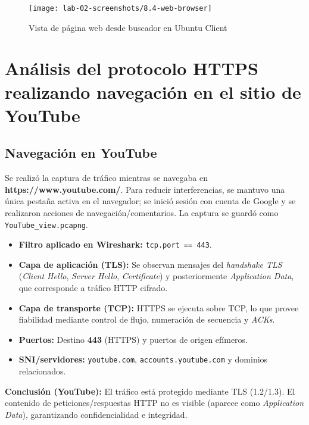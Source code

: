 \documentclass[10pt]{article}
\begin{document}
\begin{figure}[H]
    \centering
    \texttt{[image: lab-02-screenshots/8.4-web-browser]}
    \caption{Vista de página web desde buscador en Ubuntu Client}
\end{figure}


\renewcommand{\thesection}{8.\arabic{section}}
\section{Análisis del protocolo HTTPS realizando navegación en el sitio de YouTube}

\subsection{Navegación en YouTube}
Se realizó la captura de tráfico mientras se navegaba en \textbf{https://www.youtube.com/}. 
Para reducir interferencias, se mantuvo una única pestaña activa en el navegador; se inició sesión con cuenta de Google y se realizaron acciones de navegación/comentarios. 
La captura se guardó como \texttt{YouTube\_view.pcapng}.

\begin{itemize}
    \item \textbf{Filtro aplicado en Wireshark:} \texttt{tcp.port == 443}.
    \item \textbf{Capa de aplicación (TLS):} Se observan mensajes del \textit{handshake TLS} (\textit{Client Hello}, \textit{Server Hello}, \textit{Certificate}) y posteriormente \textit{Application Data}, que corresponde a tráfico HTTP cifrado.
    \item \textbf{Capa de transporte (TCP):} HTTPS se ejecuta sobre TCP, lo que provee fiabilidad mediante control de flujo, numeración de secuencia y \textit{ACKs}.
    \item \textbf{Puertos:} Destino \textbf{443} (HTTPS) y puertos de origen efímeros.
    \item \textbf{SNI/servidores:} \texttt{youtube.com}, \texttt{accounts.youtube.com} y dominios relacionados.
\end{itemize}

\noindent\textbf{Conclusión (YouTube):} 
El tráfico está protegido mediante TLS (1.2/1.3). 
El contenido de peticiones/respuestas HTTP no es visible (aparece como \textit{Application Data}), garantizando confidencialidad e integridad.
\end{document}
